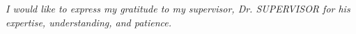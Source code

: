 


\begin{flushright}
\textit{I would like to express my gratitude to my supervisor, Dr. SUPERVISOR for his expertise, understanding, and patience.}\\
\end{flushright}

